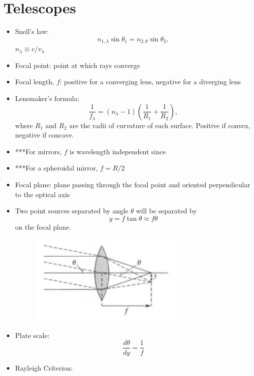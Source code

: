 \documentclass[12pt]{article}
\begin{document}
\section{Telescopes}
\begin{itemize}
\item Snell's law:
\begin{equation}
n_{1,\lambda}\sin\theta_1 = n_{2,\theta}\sin\theta_2,
\end{equation}
$n_\lambda \equiv c/v_\lambda$
\item Focal point: point at which rays converge
\item Focal length, $f$: positive for a converging lens, negative for a diverging lens
\item Lensmaker's formula:
\begin{equation}
\frac{1}{f_\lambda} = (n_\lambda - 1)\left(\frac{1}{R_1} + \frac{1}{R_2}\right),
\end{equation}
where $R_1$ and $R_2$ are the radii of curvature of each surface. Positive if convex, negative if concave.
\item ***For mirrors, $f$ is wavelength independent since 
\item ***For a spheroidal mirror, $f = R/2$
\item Focal plane: plane passing through the focal point and oriented perpendicular to the optical axis
\item Two point sources separated by angle $\theta$ will be separated by
\begin{equation}
y = f\tan \theta \approx f\theta
\end{equation}
on the focal plane.
\begin{figure}[h!]
\centering
\includegraphics[width=3in]{CandOfigs/pointsources_focalplane.png}
\end{figure}
\item Plate scale:
\begin{equation}
\frac{d\theta}{dy} = \frac{1}{f}
\end{equation}
\item Rayleigh Criterion:
\begin{equation}

\end{equation}
\end{itemize}
\end{document}
